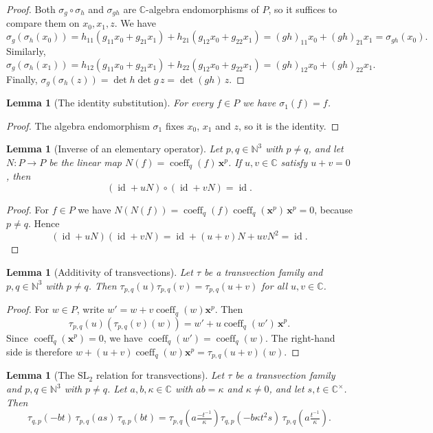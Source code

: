 \documentclass[11pt]{article}
\newtheorem{lemma}[theorem]{Lemma}
\theoremstyle{definition}
\theoremstyle{remark}
\newcommand{\CC}{\mathbb{C}}
\newcommand{\NN}{\mathbb{N}}
\DeclareMathOperator{\coeff}{coeff}
\DeclareMathOperator{\id}{id}
\begin{document}
\begin{proof}
Both $\sigma_g\circ\sigma_h$ and $\sigma_{gh}$ are $\CC$-algebra endomorphisms of $P$, so it suffices to compare them on $x_0,x_1,z$. We have
\[
\sigma_g(\sigma_h(x_0))=h_{11}(g_{11}x_0+g_{21}x_1)+h_{21}(g_{12}x_0+g_{22}x_1)=(gh)_{11}x_0+(gh)_{21}x_1=\sigma_{gh}(x_0).
\]
Similarly,
\[
\sigma_g(\sigma_h(x_1))=h_{12}(g_{11}x_0+g_{21}x_1)+h_{22}(g_{12}x_0+g_{22}x_1)=(gh)_{12}x_0+(gh)_{22}x_1.
\]
Finally, $\sigma_g(\sigma_h(z))=\det h\det g\,z=\det(gh)\,z$.
\end{proof}

\begin{lemma}[The identity substitution]\label{lem:gm_aeval_subst_one}
For every $f\in P$ we have $\sigma_1(f)=f$.
\end{lemma}

\begin{proof}
The algebra endomorphism $\sigma_1$ fixes $x_0$, $x_1$ and $z$, so it is the identity.
\end{proof}

\begin{lemma}[Inverse of an elementary operator]\label{lem:gm_L_inv}
Let $p,q\in\NN^3$ with $p\neq q$, and let $N\colon P\to P$ be the linear map $N(f)=\coeff_q(f)\,\mathbf x^p$. If $u,v\in\CC$ satisfy $u+v=0$, then
\[
(\id+uN)\circ(\id+vN)=\id .
\]
\end{lemma}

\begin{proof}
For $f\in P$ we have $N(N(f))=\coeff_q(f)\coeff_q(\mathbf x^p)\,\mathbf x^p=0$, because $p\ne q$. Hence
\[
(\id+uN)(\id+vN)=\id+(u+v)N+uvN^2=\id .
\]
\end{proof}

\begin{lemma}[Additivity of transvections]\label{lem:gm_tau_add}
Let $\tau$ be a transvection family and $p,q\in\NN^3$ with $p\neq q$. Then $\tau_{p,q}(u)\tau_{p,q}(v)=\tau_{p,q}(u+v)$ for all $u,v\in\CC$.
\end{lemma}

\begin{proof}
For $w\in P$, write $w'=w+v\coeff_q(w)\mathbf x^p$. Then
\[
\tau_{p,q}(u)(\tau_{p,q}(v)(w))=w'+u\coeff_q(w')\,\mathbf x^p .
\]
Since $\coeff_q(\mathbf x^p)=0$, we have $\coeff_q(w')=\coeff_q(w)$. The right-hand side is therefore $w+(u+v)\coeff_q(w)\mathbf x^p=\tau_{p,q}(u+v)(w)$.
\end{proof}

\begin{lemma}[The $\mathrm{SL}_2$ relation for transvections]\label{lem:gm_tau_sl2}
Let $\tau$ be a transvection family and $p,q\in\NN^3$ with $p\ne q$. Let $a,b,\kappa\in\CC$ with $ab=\kappa$ and $\kappa\ne0$, and let $s,t\in\CC^\times$. Then
\[
\tau_{q,p}(-bt)\,\tau_{p,q}(as)\,\tau_{q,p}(bt)=\tau_{p,q}\!\left(a\tfrac{-t^{-1}}{\kappa}\right)\tau_{q,p}(-b\kappa t^2s)\,\tau_{p,q}\!\left(a\tfrac{t^{-1}}{\kappa}\right).
\]
\end{lemma}
\end{document}
